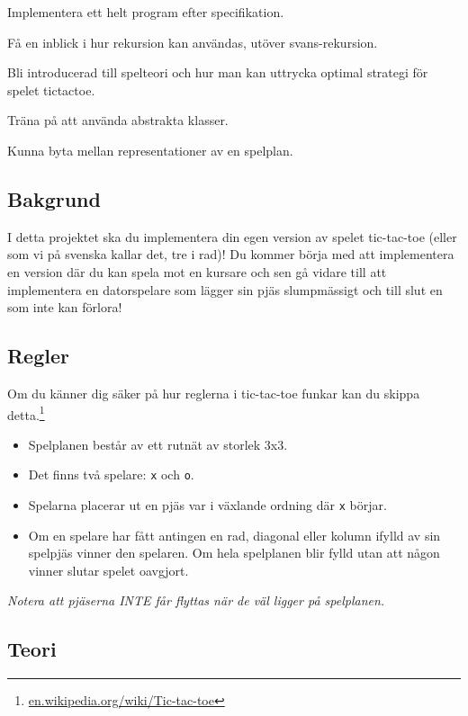 

\begin{Goals}
	\item Implementera ett helt program efter specifikation.
	\item Få en inblick i hur rekursion kan användas, utöver svans-rekursion.
	\item Bli introducerad till spelteori och hur man kan uttrycka optimal strategi för spelet tictactoe.
	\item Träna på att använda abstrakta klasser.
	\item Kunna byta mellan representationer av en spelplan.
\end{Goals}

\subsection{Bakgrund}
I detta projektet ska du implementera din egen version av spelet tic-tac-toe (eller som vi på svenska kallar det, tre i rad)! Du kommer börja med att implementera en version där du kan spela mot en kursare och sen gå vidare till att implementera en datorspelare som lägger sin pjäs slumpmässigt och till slut en som inte kan förlora!

\subsection{Regler}
Om du känner dig säker på hur reglerna i tic-tac-toe funkar kan du skippa detta.\footnote{\href{https://en.wikipedia.org/wiki/Tic-tac-toe}{en.wikipedia.org/wiki/Tic-tac-toe}}
\begin{itemize}
	\item Spelplanen består av ett rutnät av storlek 3x3.
	\item Det finns två spelare: \texttt{x} och \texttt{o}.
	\item Spelarna placerar ut en pjäs var i växlande ordning där \texttt{x} börjar.
	\item Om en spelare har fått antingen en rad, diagonal eller kolumn ifylld av sin spelpjäs vinner den spelaren. Om hela spelplanen blir fylld utan att någon vinner slutar spelet oavgjort.
\end{itemize}
\textit{Notera att pjäserna INTE får flyttas när de väl ligger på spelplanen.}

\subsection{Teori}

